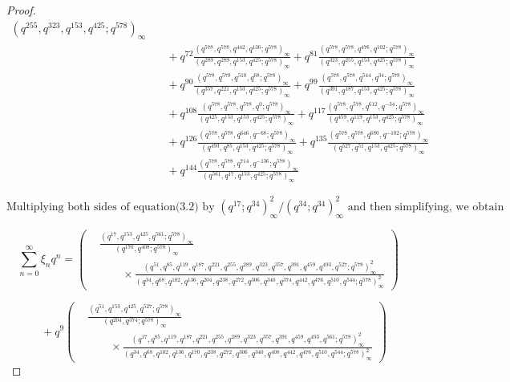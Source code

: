 \documentclass[11pt,a4paper]{article}
\numberwithin{equation}{section}
\theoremstyle{plain}
\begin{document}
\begin{proof}
\[\begin{aligned}
			{(q^{255}, q^{323}, q^{153}, q^{425}; q^{578})_{\infty}} \\
			&\quad + q^{72}\frac{(q^{578}, q^{578}, q^{442}, q^{136}; q^{578})_{\infty}}
			{(q^{289}, q^{289}, q^{153}, q^{425}; q^{578})_{\infty}}
			+ q^{81}\frac{(q^{578}, q^{578}, q^{476}, q^{102}; q^{578})_{\infty}}
			{(q^{323}, q^{255}, q^{153}, q^{425}; q^{578})_{\infty}} \\
			&\quad + q^{90}\frac{(q^{578}, q^{578}, q^{510}, q^{68}; q^{578})_{\infty}}
			{(q^{357}, q^{221}, q^{153}, q^{425}; q^{578})_{\infty}}
			+ q^{99}\frac{(q^{578}, q^{578}, q^{544}, q^{34}; q^{578})_{\infty}}
			{(q^{391}, q^{187}, q^{153}, q^{425}; q^{578})_{\infty}} \\
			&\quad + q^{108}\frac{(q^{578}, q^{578}, q^{578}, q^{0}; q^{578})_{\infty}}
			{(q^{425}, q^{153}, q^{153}, q^{425}; q^{578})_{\infty}}
			+ q^{117}\frac{(q^{578}, q^{578}, q^{612}, q^{-34}; q^{578})_{\infty}}
			{(q^{459}, q^{119}, q^{153}, q^{425}; q^{578})_{\infty}} \\
			&\quad + q^{126}\frac{(q^{578}, q^{578}, q^{646}, q^{-68}; q^{578})_{\infty}}
			{(q^{493}, q^{85}, q^{153}, q^{425}; q^{578})_{\infty}}
			+ q^{135}\frac{(q^{578}, q^{578}, q^{680}, q^{-102}; q^{578})_{\infty}}
			{(q^{527}, q^{51}, q^{153}, q^{425}; q^{578})_{\infty}}\\
			&\quad +  q^{144}\frac{(q^{578}, q^{578}, q^{714}, q^{-136}; q^{578})_{\infty}}
			{(q^{561}, q^{17}, q^{153}, q^{425}; q^{578})_{\infty}}
		\end{aligned}
		\tag{3.2}
		\]
		
		
	\[
	\text{Multiplying both sides of  equation(3.2) by }
	{(q^{17}; q^{34})_{\infty}^{2}}/{(q^{34}; q^{34})_{\infty}^{2}}
	\text{ and then simplifying, we obtain}
	\]
	
	\[
	\sum_{n=0}^{\infty} \xi_n q^n
	=
	\left(
	\begin{aligned}
		&\frac{(q^{17}, q^{153}, q^{425}, q^{561}; q^{578})_{\infty}}
		{(q^{170}, q^{408}; q^{578})_{\infty}} \\
		&\qquad \times
		\frac{
			(q^{51}, q^{85}, q^{119}, q^{187}, q^{221}, q^{255}, q^{289}, q^{323}, q^{357}, q^{391}, q^{459}, q^{493}, q^{527}; q^{578})_{\infty}^{2}
		}{
			(q^{34}, q^{68}, q^{102}, q^{136}, q^{204}, q^{238}, q^{272}, q^{306}, q^{340}, q^{374}, q^{442}, q^{476}, q^{510}, q^{544}; q^{578})_{\infty}^{2}
		}
	\end{aligned}
	\right)
	\]
	
	\[
	\quad + q^{9}\left(
	\begin{aligned}
		&\frac{(q^{51}, q^{153}, q^{425}, q^{527}; q^{578})_{\infty}}
		{(q^{204}, q^{374}; q^{578})_{\infty}} \\
		&\qquad \times
		\frac{
			(q^{17}, q^{85}, q^{119}, q^{187}, q^{221}, q^{255}, q^{289}, q^{323}, q^{357}, q^{391}, q^{459}, q^{493}, q^{561}; q^{578})_{\infty}^{2}
		}{
			(q^{34}, q^{68}, q^{102}, q^{136}, q^{170}, q^{238}, q^{272}, q^{306}, q^{340}, q^{408}, q^{442}, q^{476}, q^{510}, q^{544}; q^{578})_{\infty}^{2}
		}
	\end{aligned}
	\right)
	\]
	

\end{proof}
\end{document}
